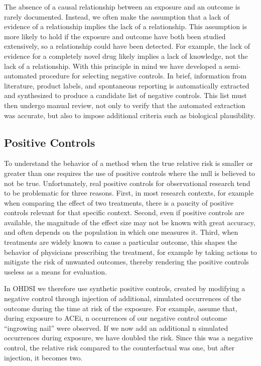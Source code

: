 \documentclass[11pt]{book}
\theoremstyle{definition}
\theoremstyle{definition}
\theoremstyle{definition}
\theoremstyle{remark}
\begin{document}
The absence of a causal relationship between an exposure and an outcome
is rarely documented. Instead, we often make the assumption that a lack
of evidence of a relationship implies the lack of a relationship. This
assumption is more likely to hold if the exposure and outcome have both
been studied extensively, so a relationship could have been detected.
For example, the lack of evidence for a completely novel drug likely
implies a lack of knowledge, not the lack of a relationship. With this
principle in mind we have developed a semi-automated procedure for
selecting negative controls. \citep{voss_2016} In brief, information
from literature, product labels, and spontaneous reporting is
automatically extracted and synthesized to produce a candidate list of
negative controls. This list must then undergo manual review, not only
to verify that the automated extraction was accurate, but also to impose
additional criteria such as biological plausibility.

\subsection{Positive Controls}\label{PositiveControls}


To understand the behavior of a method when the true relative risk is
smaller or greater than one requires the use of positive controls where
the null is believed to not be true. Unfortunately, real positive
controls for observational research tend to be problematic for three
reasons. First, in most research contexts, for example when comparing
the effect of two treatments, there is a paucity of positive controls
relevant for that specific context. Second, even if positive controls
are available, the magnitude of the effect size may not be known with
great accuracy, and often depends on the population in which one
measures it. Third, when treatments are widely known to cause a
particular outcome, this shapes the behavior of physicians prescribing
the treatment, for example by taking actions to mitigate the risk of
unwanted outcomes, thereby rendering the positive controls useless as a
means for evaluation. \citep{noren_2014}


In OHDSI we therefore use synthetic positive controls,
\citep{schuemie_2018} created by modifying a negative control through
injection of additional, simulated occurrences of the outcome during the
time at risk of the exposure. For example, assume that, during exposure
to ACEi, n occurrences of our negative control outcome ``ingrowing
nail'' were observed. If we now add an additional n simulated
occurrences during exposure, we have doubled the risk. Since this was a
negative control, the relative risk compared to the counterfactual was
one, but after injection, it becomes two.
\end{document}
